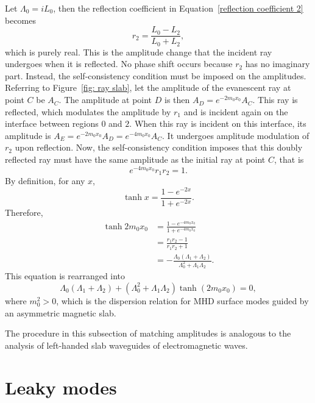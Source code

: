 	Let $\Lambda_0 = iL_0$, then the reflection coefficient in Equation~\eqref{reflection coefficient 2} becomes
	\begin{equation}
	r_2 = \frac{L_0 - L_2}{L_0 + L_2},
	\end{equation}
	which is purely real. This is the amplitude change that the incident ray undergoes when it is reflected. No phase shift occurs because $r_2$ has no imaginary part. Instead, the self-consistency condition must be imposed on the amplitudes. Referring to Figure~\ref{fig: ray slab}, let the amplitude of the evanescent ray at point $C$ be $A_C$. The amplitude at point $D$ is then $A_D = e^{-2m_0x_0}A_C$. This ray is reflected, which modulates the amplitude by $r_1$ and is incident again on the interface between regions $0$ and $2$. When this ray is incident on this interface, its amplitude is $A_E = e^{-2m_0x_0}A_D = e^{-4m_0x_0}A_C$. It undergoes amplitude modulation of $r_2$ upon reflection. Now, the self-consistency condition imposes that this doubly reflected ray must have the same amplitude as the initial ray at point $C$, that is
	\begin{equation}
	e^{-4m_0x_0}r_1r_2 = 1.
	\end{equation}
	By definition, for any $x$,
	\begin{equation}
	\tanh{x} = \frac{1 - e^{-2x}}{1 + e^{-2x}}.
	\end{equation}
	Therefore,
	\begin{align}
	\tanh{2m_0x_0} &= \frac{1 - e^{-4m_0x_0}}{1 + e^{-4m_0x_0}} \\
	&= \frac{r_1r_2 - 1}{r_1r_2 + 1} \\
	&= -\frac{\Lambda_0(\Lambda_1 + \Lambda_2)}{\Lambda_0^2 + \Lambda_1\Lambda_2}.
	\end{align}
	This equation is rearranged into
	\begin{equation}
	\Lambda_0 (\Lambda_1 + \Lambda_2) + (\Lambda_0^2 + \Lambda_1\Lambda_2)\tanh(2m_0x_0) = 0,
	\end{equation}
	where $m_0^2 > 0$, which is the dispersion relation for MHD surface modes guided by an asymmetric magnetic slab.
	
	The procedure in this subsection of matching amplitudes is analogous to the analysis of left-handed slab waveguides of electromagnetic waves.
	
	
	\section{Leaky modes}
	\label{sec: leaky}
	
